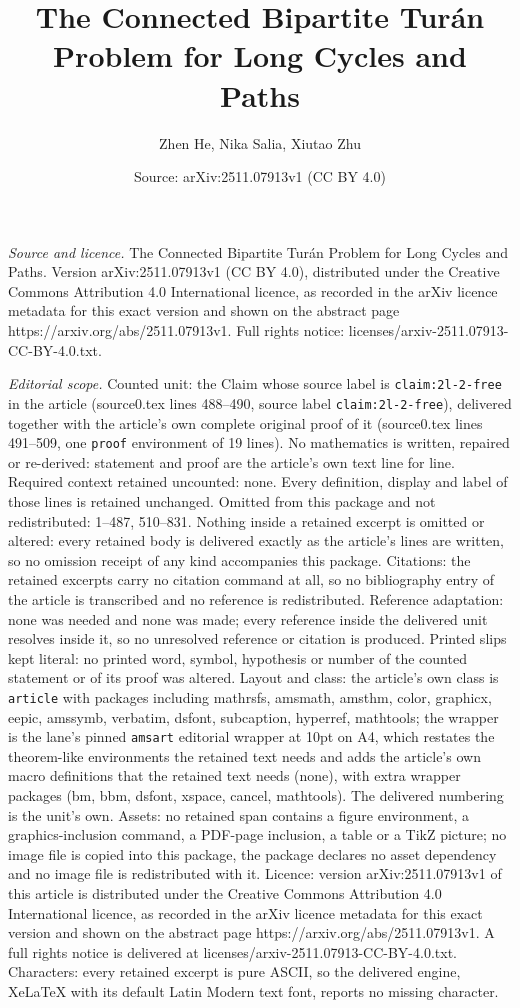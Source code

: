 \documentclass[10pt,a4paper]{amsart}
\title[The Connected Bipartite Tur\'an Problem for Long Cycles and ]{The Connected Bipartite Tur\'an Problem for Long Cycles and Paths}
\author{Zhen He, Nika Salia, Xiutao Zhu}
\date{Source: arXiv:2511.07913v1 (CC BY 4.0)}
\begin{document}
\maketitle

\noindent\emph{Source and licence.} The Connected Bipartite Tur\'an Problem for Long Cycles and Paths. Version arXiv:2511.07913v1 (CC BY 4.0), distributed under the Creative Commons Attribution 4.0 International licence, as recorded in the arXiv licence metadata for this exact version and shown on the abstract page https://arxiv.org/abs/2511.07913v1. Full rights notice: licenses/arxiv-2511.07913-CC-BY-4.0.txt.\par\smallskip

\noindent\textit{Editorial scope.} Counted unit: the Claim whose source label is \texttt{claim:2l-2-free} in the article (source0.tex lines 488--490, source label \texttt{claim:2l-2-free}), delivered together with the article's own complete original proof of it (source0.tex lines 491--509, one \texttt{proof} environment of 19 lines). No mathematics is written, repaired or re-derived: statement and proof are the article's own text line for line. Required context retained uncounted: none. Every definition, display and label of those lines is retained unchanged. Omitted from this package and not redistributed: 1--487, 510--831. Nothing inside a retained excerpt is omitted or altered: every retained body is delivered exactly as the article's lines are written, so no omission receipt of any kind accompanies this package. Citations: the retained excerpts carry no citation command at all, so no bibliography entry of the article is transcribed and no reference is redistributed. Reference adaptation: none was needed and none was made; every reference inside the delivered unit resolves inside it, so no unresolved reference or citation is produced. Printed slips kept literal: no printed word, symbol, hypothesis or number of the counted statement or of its proof was altered. Layout and class: the article's own class is \texttt{article} with packages including mathrsfs, amsmath, amsthm, color, graphicx, eepic, amssymb, verbatim, dsfont, subcaption, hyperref, mathtools; the wrapper is the lane's pinned \texttt{amsart} editorial wrapper at 10pt on A4, which restates the theorem-like environments the retained text needs and adds the article's own macro definitions that the retained text needs (none), with extra wrapper packages (bm, bbm, dsfont, xspace, cancel, mathtools). The delivered numbering is the unit's own. Assets: no retained span contains a figure environment, a graphics-inclusion command, a PDF-page inclusion, a table or a TikZ picture; no image file is copied into this package, the package declares no asset dependency and no image file is redistributed with it. Licence: version arXiv:2511.07913v1 of this article is distributed under the Creative Commons Attribution 4.0 International licence, as recorded in the arXiv licence metadata for this exact version and shown on the abstract page https://arxiv.org/abs/2511.07913v1. A full rights notice is delivered at licenses/arxiv-2511.07913-CC-BY-4.0.txt. Characters: every retained excerpt is pure ASCII, so the delivered engine, XeLaTeX with its default Latin Modern text font, reports no missing character.
\end{document}
